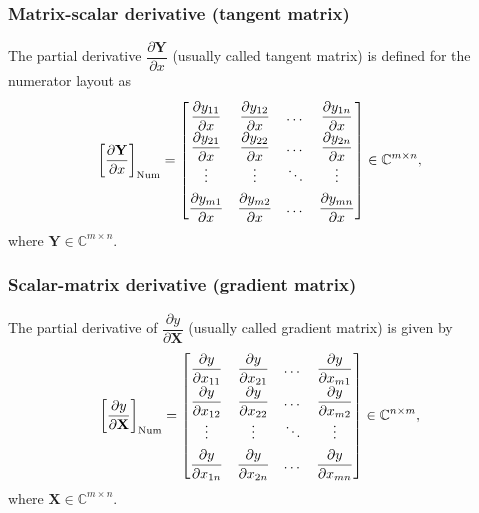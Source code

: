 \documentclass{article}
\begin{document}
\subsubsection{Matrix-scalar derivative (tangent matrix)}
The partial derivative \(\dfrac{\partial \mathbf{Y}}{\partial x}\) (usually called tangent matrix) is defined for the numerator layout as
\begin{align}
    \label{eq:tangent-num}
    \left[\dfrac{\partial \mathbf{Y}}{\partial x}\right]_{\textnormal{Num}} \renewcommand{\arraystretch}{1.8} = \begin{bmatrix}
        \dfrac{\partial y_{11}}{\partial x} & \dfrac{\partial y_{12}}{\partial x} & \dots & \dfrac{\partial y_{1n}}{\partial x} \\
        \dfrac{\partial y_{21}}{\partial x} & \dfrac{\partial y_{22}}{\partial x} & \dots & \dfrac{\partial y_{2n}}{\partial x} \\
        \vdots & \vdots & \ddots & \vdots \\
        \dfrac{\partial y_{m1}}{\partial x} & \dfrac{\partial y_{m2}}{\partial x} & \dots & \dfrac{\partial y_{mn}}{\partial x} \\
    \end{bmatrix} \in \mathbb{C}^{m \times n},
\end{align}
where \(\mathbf{Y} \in \mathbb{C}^{m \times n}\).

\subsubsection{Scalar-matrix derivative (gradient matrix)}
The partial derivative of \(\dfrac{\partial y}{\partial \mathbf{X}}\) (usually called gradient matrix) is given by
\begin{align}
    \label{eq:gradient-matrix-num}
    \renewcommand{\arraystretch}{1.8}
			\left[\dfrac{\partial y}{\partial \mathbf{X}}\right]_{\textnormal{Num}} = \begin{bmatrix}
				\dfrac{\partial y}{\partial x_{11}} & \dfrac{\partial y}{\partial x_{21}} & \dots & \dfrac{\partial y}{\partial x_{m1}} \\
				\dfrac{\partial y}{\partial x_{12}} & \dfrac{\partial y}{\partial x_{22}} & \dots & \dfrac{\partial y}{\partial x_{m2}} \\
				\vdots & \vdots & \ddots & \vdots \\
				\dfrac{\partial y}{\partial x_{1n}} & \dfrac{\partial y}{\partial x_{2n}} & \dots & \dfrac{\partial y}{\partial x_{mn}} \\
			\end{bmatrix} \in \mathbb{C}^{n \times m},
\end{align}
where \(\mathbf{X} \in \mathbb{C}^{m \times n}\).
\end{document}
